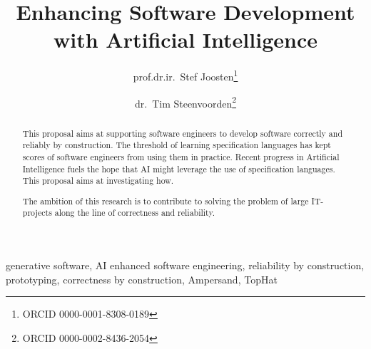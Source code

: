 \documentclass{elsarticle}
\begin{document}
% 

\title{Enhancing Software Development with Artificial Intelligence}
\author{prof.dr.ir.\ Stef Joosten\footnote{ORCID 0000-0001-8308-0189}}
\author{dr.\ Tim Steenvoorden\footnote{ORCID 0000-0002-8436-2054}}
\address{Open Universiteit Nederland, Heerlen, the Netherlands}

\begin{abstract}
    This proposal aims at supporting software engineers to develop software correctly and reliably by construction.
    The threshold of learning specification languages has kept scores of software engineers from using them in practice.
    Recent progress in Artificial Intelligence fuels the hope that AI might leverage the use of specification languages.
    This proposal aims at investigating how.

    The ambition of this research is to contribute to solving the problem of large IT-projects
    along the line of correctness and reliability.
\end{abstract}

\begin{keyword}
    generative software, AI enhanced software engineering, reliability by construction, prototyping, correctness by construction, Ampersand, TopHat
\end{keyword}
\maketitle
\end{document}
